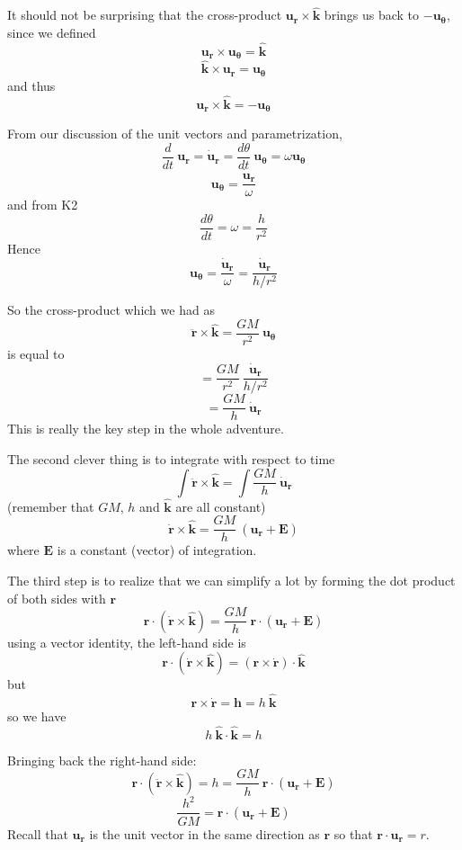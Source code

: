 \documentclass[11pt, oneside]{article}
\begin{document}
It should not be surprising that the cross-product $\mathbf{u_r} \times \hat{\mathbf{k}} $ brings us back to $- \mathbf{u_\theta}$, since we defined
\[ \mathbf{u_r} \times \mathbf{u_{\theta}} = \hat{\mathbf{k}} \]
\[  \hat{\mathbf{k}} \times \mathbf{u_r} = \mathbf{u_{\theta}} \]
and thus
\[  \mathbf{u_r} \times\hat{\mathbf{k}} = - \mathbf{u_{\theta}} \]

From our discussion of the unit vectors and parametrization,
\[ \frac{d}{dt} \ \mathbf{u_r} = \dot{\mathbf{u}}_\mathbf{r} = \frac{d\theta}{dt} \ \mathbf{u_\theta} = \omega \mathbf{u_\theta} \]
\[ \mathbf{u_\theta} = \frac{\dot{\mathbf{u}}_{\mathbf{r}}}{\omega} \]
and from K2
\[ \frac{d \theta}{dt} = \omega = \frac{h}{r^2} \]
Hence
\[  \mathbf{u_\theta} =  \frac{\dot{\mathbf{u}}_{\mathbf{r}}}{\omega} = \frac{\dot{\mathbf{u}}_{\mathbf{r}}}{h/r^2} \]

So the cross-product which we had as
\[ \ddot{\mathbf{r}} \times \hat{\mathbf{k}} = \frac{GM}{r^2} \  \mathbf{u_\theta} \]
is equal to
\[ = \frac{GM}{r^2} \  \frac{\dot{\mathbf{u}}_{\mathbf{r}}}{h/r^2} \]
\[ = \frac{GM}{h} \ \dot{\mathbf{u}}_{\mathbf{r}}  \]
This is really the key step in the whole adventure.

The second clever thing is to integrate with respect to time
\[ \int \ddot{\mathbf{r}} \times \hat{\mathbf{k}} = \int \frac{GM}{h} \ \dot{\mathbf{u}}_{\mathbf{r}}  \]
(remember that $GM$, $h$ and $\hat{\mathbf{k}}$ are all constant)
\[ \dot{\mathbf{r}} \times \hat{\mathbf{k}} = \frac{GM}{h} \ ( \mathbf{u_r} + \mathbf{E}) \]
where $ \mathbf{E}$ is a constant (vector) of integration.

The third step is to realize that we can simplify a lot by forming the dot product of both sides with $\mathbf{r}$
\[ \mathbf{r} \cdot ( \dot{\mathbf{r}} \times \hat{\mathbf{k}}) = \frac{GM}{h} \ \mathbf{r} \cdot ( \mathbf{u_r} + \mathbf{E}) \]
using a vector identity, the left-hand side is
\[ \mathbf{r} \cdot ( \dot{\mathbf{r}} \times \hat{\mathbf{k}}) = (\mathbf{r} \times \dot{\mathbf{r}}) \cdot \hat{\mathbf{k}} \]
but 
\[ \mathbf{r} \times \dot{\mathbf{r}} = \mathbf{h} =  h \ \hat{\mathbf{k}} \]
so we have
\[ h \ \hat{\mathbf{k}} \cdot \hat{\mathbf{k}} = h \]

Bringing back the right-hand side:
\[ \mathbf{r} \cdot (\ddot{\mathbf{r}} \times \hat{\mathbf{k}}) = h = \frac{GM}{h} \ \mathbf{r} \cdot ( \mathbf{u_r} + \mathbf{E}) \]
\[ \frac{h^2}{GM} =  \mathbf{r} \cdot ( \mathbf{u_r}+ \mathbf{E}) \]
Recall that $ \mathbf{u_r}$ is the unit vector in the same direction as $\mathbf{r}$ so that $\mathbf{r} \cdot  \mathbf{u_r} = r$.
\end{document}
